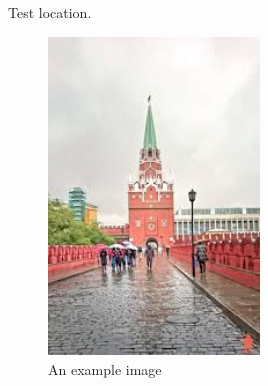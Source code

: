 \documentclass{article}
\begin{document}
\lipsum[1-4] %
Test location.
\begin{figure}[ht]
\centering
\includegraphics[width=0.5\textwidth]{example-image-a.jpg}
\caption{An example image}
\end{figure}
\lipsum[6-10] %
\end{document}
